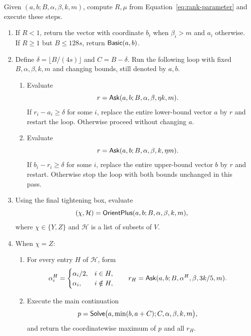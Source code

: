 \begin{procedure}\label{proc:solve}
Given $(a,b;B,\alpha,\beta,k,m)$, compute $R,\mu$ from
Equation~\eqref{eq:rank-parameter} and execute these steps.
\begin{enumerate}[label=\textbf{S\arabic*.},ref=S\arabic*,leftmargin=*]
\item\label{alg:solve-base}
If $R<1$, return the vector with coordinate $b_i$ when $\beta_i>m$
and $a_i$ otherwise. If $R\ge1$ but $B\le128s$, return $\mathsf{Basic}(a,b)$.

\item\label{alg:solve-tighten}
Define $\delta=\lfloor B/(4s)\rfloor$ and $C=B-\delta$.
Run the following loop with fixed $B,\alpha,\beta,k,m$ and changing
bounds, still denoted by $a,b$.
\begin{enumerate}[label=(\alph*),leftmargin=*]
\item Evaluate
\[
 r=\mathsf{Ask}(a,b;B,\alpha,\beta,\eta k,m).
\]
If $r_i-a_i\ge\delta$ for some $i$, replace the entire lower-bound
vector $a$ by $r$ and restart the loop. Otherwise proceed without
changing $a$.
\item Evaluate
\[
 r=\mathsf{Ask}(a,b;B,\alpha,\beta,k,\eta m).
\]
If $b_i-r_i\ge\delta$ for some $i$, replace the entire upper-bound
vector $b$ by $r$ and restart. Otherwise stop the loop with both
bounds unchanged in this pass.
\end{enumerate}

\item\label{alg:solve-orient}
Using the final tightening box, evaluate
\[
 (\chi,\mathcal H)=\mathsf{OrientPlus}(a,b;B,\alpha,\beta,k,m),
\]
where $\chi\in\{Y,Z\}$ and $\mathcal H$ is a list of subsets of $V$.

\item\label{alg:solve-z}
When $\chi=Z$:
\begin{enumerate}[label=(\alph*),leftmargin=*]
\item For every entry $H$ of $\mathcal H$, form
\[
 \alpha_i^H=\begin{cases}\alpha_i/2,&i\in H,\\\alpha_i,&i\notin H,\end{cases}
 \qquad r_H=\mathsf{Ask}(a,b;B,\alpha^H,\beta,3k/5,m).
\]
\item Execute the main continuation
\[
 p=\mathsf{Solve}\bigl(a,\min(b,a+C);C,\alpha,\beta,k,m\bigr),
\]
and return the coordinatewise maximum of $p$ and all $r_H$.
\end{enumerate}


\end{enumerate}
\end{procedure}

